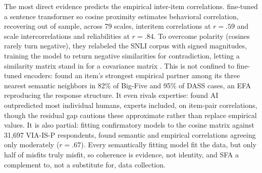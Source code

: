 The most direct evidence predicts the empirical inter-item correlations.
\citet{hommel-arslan-2025} fine-tuned a sentence transformer so cosine proximity
estimates behavioral correlation, recovering out of sample, across 79 scales,
interitem correlations at $r=.59$ and scale intercorrelations and reliabilities at
$r=.84$. To overcome polarity (cosines rarely turn negative), they relabeled the
SNLI corpus with signed magnitudes, training the model to return negative
similarities for contradiction, letting a similarity matrix stand in for a
covariance matrix \citep{hommel-arslan-2025, bowman-etal-2015}.
This is not confined to fine-tuned encoders: \citet{ravenda-etal-2025} found an
item's strongest empirical partner among its three nearest semantic neighbors in
82\% of Big-Five and 95\% of DASS cases, an EFA reproducing the response structure.
It even rivals expertise: \citet{schoenegger-etal-2025} found AI outpredicted most
individual humans, experts included, on item-pair correlations, though the residual
gap cautions these approximate rather than replace empirical values. It is also
partial: fitting confirmatory models to the cosine matrix against 31,697 VIA-IS-P
respondents, \citet{feraco-toffalini-2025} found semantic and empirical correlations
agreeing only moderately ($r=.67$). Every semantically fitting model fit the data,
but only half of misfits truly misfit, so coherence is evidence, not identity, and
SFA a complement to, not a substitute for, data collection.
